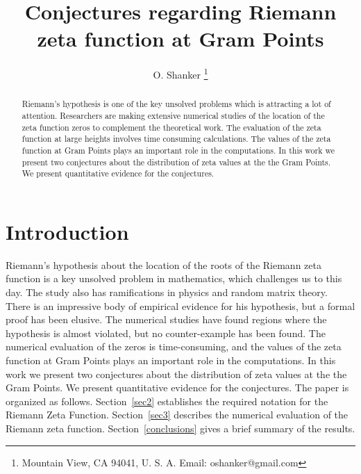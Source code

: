\documentclass[twoside]{article}
\begin{document}
\date{}
\lhead[]{}
\rhead[]{}

\title{\bf{Conjectures regarding Riemann zeta function at Gram Points}}


\author{O. Shanker 
 \thanks{Mountain View, CA 94041, U. S. A. Email: oshanker@gmail.com
 }
}

\maketitle
\thispagestyle{fancy}

\begin{abstract}
Riemann's hypothesis is one of the key unsolved problems which is attracting
a lot of attention. 
Researchers are making extensive numerical studies of the location of the 
zeta function zeros to complement the theoretical work. 
The evaluation of the zeta function at large heights involves time consuming
calculations. The values of the 
zeta function at Gram Points plays an important role in the computations. In 
this work we present two conjectures about the distribution of zeta values at the 
the Gram Points. We present quantitative evidence for the conjectures.
\end{abstract}




\clearpage
{}


\section{Introduction}
Riemann's hypothesis about the location of 
the roots of the Riemann zeta function is a key unsolved problem in mathematics,
which challenges us to this day. The study also has ramifications in physics and
random matrix theory. 
There is an impressive body of empirical evidence for his hypothesis,
but a formal proof has been elusive. The numerical studies have found
regions where the hypothesis is almost violated, but no counter-example has
been found. The numerical evaluation of the zeros is time-consuming, and the values of the 
zeta function at Gram Points plays an important role in the computations. In 
this work we present two conjectures about the distribution of zeta values at the 
the Gram Points. We present quantitative evidence for the conjectures. The paper is organized as follows.
Section~\ref{sec2} establishes the required notation for the 
Riemann Zeta Function. 
Section~\ref{sec3} describes the numerical evaluation of the Riemann zeta function. 
Section~\ref{conclusions}
gives a brief summary of the results. 
\end{document}
